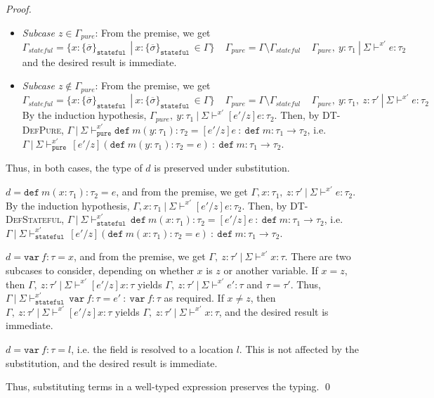 \documentclass{llncs}
\newcommand{\keywadj}[1]{\mathtt{#1}}
\newcommand{\keyw}[1]{\keywadj{#1}~}
\newcommand{\pcase}[1][]{
  \if\relax\detokenize{#1}\relax
    \def\thiscase{}
  \else
    \def\thiscase{~#1}
  \fi
  \item
}
\begin{document}
\begin{proof}
\begin{pcases}
\begin{itemize}
\item[] \textit{Subcase $z \in \Gamma_{pure}$}: From the premise, we get
\[
\Gamma_{stateful} = \{x : \{ \overline{\sigma} \}_{\keyw{stateful}} ~|~ x : \{ \overline{\sigma} \}_{\keyw{stateful}} \in \Gamma\}~~~~~\Gamma_{pure} = \Gamma \setminus \Gamma_{stateful}~~~~~\Gamma_{pure},~y : \tau_1~|~\Sigma \vdash^{x'} e : \tau_2
\]
and the desired result is immediate.

\item[] \textit{Subcase $z \not\in \Gamma_{pure}$}: From the premise, we get
\[
\Gamma_{stateful} = \{x : \{ \overline{\sigma} \}_{\keyw{stateful}} ~|~ x : \{ \overline{\sigma} \}_{\keyw{stateful}} \in \Gamma\}~~~~~\Gamma_{pure} = \Gamma \setminus \Gamma_{stateful}~~~~~\Gamma_{pure},~y : \tau_1,~z : \tau'~|~\Sigma \vdash^{x'} e : \tau_2
\]
By the induction hypothesis, $\Gamma_{pure},~y : \tau_1~|~\Sigma \vdash^{x'} [e'/z]e : \tau_2$. Then, by \textsc{DT-DefPure}, $\Gamma~|~\Sigma \vdash^{x'}_{\keywadj{pure}} \keyw{def} m(y : \tau_1) : \tau_2 = [e'/z]e~:~\keyw{def} m : \tau_1 \rightarrow \tau_2$, i.e. $\Gamma~|~\Sigma \vdash^{x'}_{\keyw{pure}} [e'/z](\keyw{def} m(y : \tau_1) : \tau_2 = e)~:~\keyw{def} m : \tau_1 \rightarrow \tau_2$.
\end{itemize}

Thus, in both cases, the type of $d$ is preserved under substitution.
\\
\pcase[\textsc{DT-DefStateful}]
$d = \keyw{def} m(x : \tau_1) : \tau_2 = e$, and from the premise, we get $\Gamma, x : \tau_1,~z : \tau'~|~\Sigma \vdash^{x'} e : \tau_2$. By the induction hypothesis, $\Gamma, x : \tau_1~|~\Sigma \vdash^{x'} [e'/z]e : \tau_2$. Then, by \textsc{DT-DefStateful}, $\Gamma~|~\Sigma \vdash^{x'}_{\keyw{stateful}} \keyw{def} m(x : \tau_1) : \tau_2 = [e'/z]e~:~\keyw{def} m : \tau_1 \rightarrow \tau_2$, i.e. $\Gamma~|~\Sigma \vdash^{x'}_{\keyw{stateful}} [e'/z](\keyw{def} m(x : \tau_1) : \tau_2 = e)~:~\keyw{def} m : \tau_1 \rightarrow \tau_2$.
\\
\pcase[\textsc{DT-Varx}]
$d = \keyw{var} f : \tau = x$, and from the premise, we get $\Gamma,~z : \tau'~|~\Sigma \vdash^{x'} x : \tau$. There are two subcases to consider, depending on whether $x$ is $z$ or another variable. If $x = z$, then $\Gamma,~z : \tau'~|~\Sigma \vdash^{x'} [e'/z]x : \tau$ yields $\Gamma,~z : \tau'~|~\Sigma \vdash^{x'} e' : \tau$ and $\tau = \tau'$. Thus, $\Gamma~|~\Sigma \vdash^{x'}_{\keyw{stateful}} \keyw{var} f : \tau = e'~:~\keyw{var} f : \tau$ as required. If $x \not = z$, then $\Gamma,~z : \tau'~|~\Sigma \vdash^{x'} [e'/z]x : \tau$ yields $\Gamma,~z : \tau'~|~\Sigma \vdash^{x'} x : \tau$, and the desired result is immediate.
\\
\pcase[\textsc{DT-Varl}]
$d = \keyw{var} f : \tau = l$, i.e. the field is resolved to a location $l$. This is not affected by the substitution, and the desired result is immediate.

\end{pcases}

\noindent Thus, substituting terms in a well-typed expression preserves the typing. \qed
\end{proof}
\end{document}
